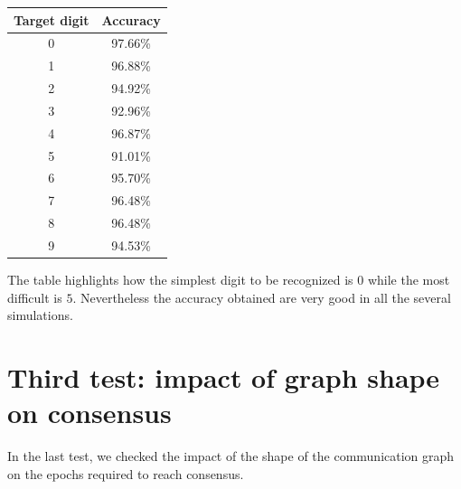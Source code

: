 \documentclass[a4paper,11pt,oneside]{book}
\begin{document}
\begin{center}
\begin{tabular}{|c|c|}
\hline
Target digit & Accuracy \\
\hline
0 & 97.66\% \\
1 & 96.88\% \\
2 & 94.92\% \\
3 & 92.96\% \\
4 & 96.87\% \\
5 & 91.01\% \\
6 & 95.70\% \\
7 & 96.48\%\\
8 & 96.48\% \\
9 & 94.53\% \\
\hline
\end{tabular}
\end{center}

The table highlights how the simplest digit to be recognized is $0$ while the most difficult is $5$. Nevertheless the accuracy obtained are very good in all the several simulations.

\section{Third test: impact of graph shape on consensus}
In the last test, we checked the impact of the shape of the communication graph on the epochs required to reach consensus.
\end{document}
